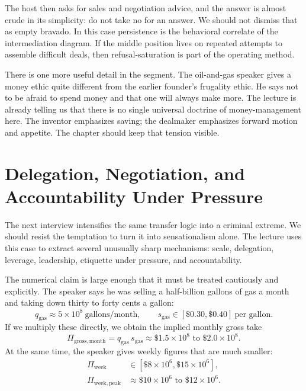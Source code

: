The host then asks for sales and negotiation advice, and the answer is almost crude in its simplicity: do not take no for an answer. We should not dismiss that as empty bravado. In this case persistence is the behavioral correlate of the intermediation diagram. If the middle position lives on repeated attempts to assemble difficult deals, then refusal-saturation is part of the operating method.

There is one more useful detail in the segment. The oil-and-gas speaker gives a money ethic quite different from the earlier founder's frugality ethic. He says not to be afraid to spend money and that one will always make more. The lecture is already telling us that there is no single universal doctrine of money-management here. The inventor emphasizes saving; the dealmaker emphasizes forward motion and appetite. The chapter should keep that tension visible.

\section{Delegation, Negotiation, and Accountability Under Pressure}

The next interview intensifies the same transfer logic into a criminal extreme. We should resist the temptation to turn it into sensationalism alone. The lecture uses this case to extract several unusually sharp mechanisms: scale, delegation, leverage, leadership, etiquette under pressure, and accountability.

The numerical claim is large enough that it must be treated cautiously and explicitly. The speaker says he was selling a half-billion gallons of gas a month and taking down thirty to forty cents a gallon:
\begin{equation}
q_{\mathrm{gas}}\approx 5\times 10^8\ \text{gallons/month}, \qquad
s_{\mathrm{gas}}\in[\$0.30,\$0.40]\ \text{per gallon}.
\end{equation}
If we multiply these directly, we obtain the implied monthly gross take
\begin{equation}
\Pi_{\mathrm{gross,month}}=q_{\mathrm{gas}}\,s_{\mathrm{gas}}
\approx \$1.5\times 10^8 \text{ to } \$2.0\times 10^8.
\end{equation}
At the same time, the speaker gives weekly figures that are much smaller:
\begin{align}
\Pi_{\mathrm{week}} &\in [\$8\times 10^6,\$15\times 10^6], \\
\Pi_{\mathrm{week,peak}} &\approx \$10\times 10^6 \text{ to } \$12\times 10^6 .
\end{align}


